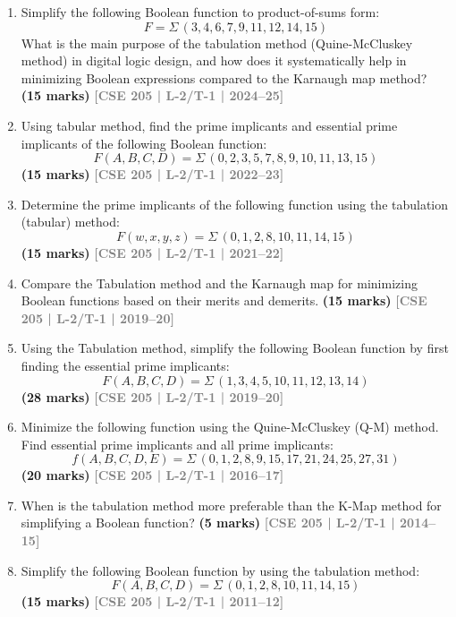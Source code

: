 \documentclass[12pt]{article}
\newcommand{\yr}[1]{\hfill\textcolor{gray}{\small\textbf{[#1]}}}
\newcommand{\mk}[1]{\textcolor{orange!70!black}{\small\textbf{(#1 marks)}}}
\begin{document}
\begin{enumerate}


\item Simplify the following Boolean function to product-of-sums form:
\[ F = \Sigma\,(3,4,6,7,9,11,12,14,15) \]
What is the main purpose of the tabulation method (Quine-McCluskey method) in digital logic design, and how does it systematically help in minimizing Boolean expressions compared to the Karnaugh map method?
\mk{15} \yr{CSE 205 | L-2/T-1 | 2024--25}

\item Using tabular method, find the prime implicants and essential prime implicants of the following Boolean function:
\[ F(A, B, C, D) = \Sigma\,(0, 2, 3, 5, 7, 8, 9, 10, 11, 13, 15) \]
\mk{15} \yr{CSE 205 | L-2/T-1 | 2022--23}

\item Determine the prime implicants of the following function using the tabulation (tabular) method:
\[ F(w, x, y, z) = \Sigma\,(0, 1, 2, 8, 10, 11, 14, 15) \]
\mk{15} \yr{CSE 205 | L-2/T-1 | 2021--22}

\item Compare the Tabulation method and the Karnaugh map for minimizing Boolean functions based on their merits and demerits.
\mk{15} \yr{CSE 205 | L-2/T-1 | 2019--20}

\item Using the Tabulation method, simplify the following Boolean function by first finding the essential prime implicants:
\[ F(A,B,C,D) = \Sigma\,(1,3,4,5,10,11,12,13,14) \]
\mk{28} \yr{CSE 205 | L-2/T-1 | 2019--20}

\item Minimize the following function using the Quine-McCluskey (Q-M) method. Find essential prime implicants and all prime implicants:
\[ f(A,B,C,D,E) = \Sigma\,(0,1,2,8,9,15,17,21,24,25,27,31) \]
\mk{20} \yr{CSE 205 | L-2/T-1 | 2016--17}

\item When is the tabulation method more preferable than the K-Map method for simplifying a Boolean function?
\mk{5} \yr{CSE 205 | L-2/T-1 | 2014--15}

\item Simplify the following Boolean function by using the tabulation method:
\[ F(A,B,C,D) = \Sigma\,(0,1,2,8,10,11,14,15) \]
\mk{15} \yr{CSE 205 | L-2/T-1 | 2011--12}

\end{enumerate}
\end{document}
